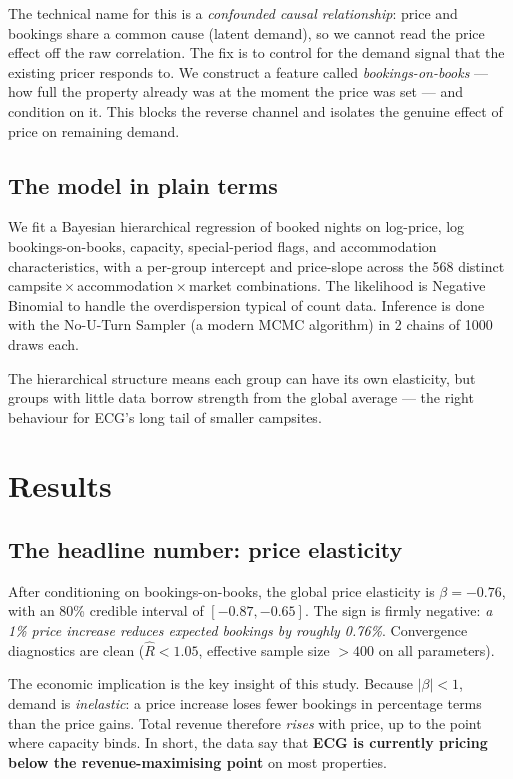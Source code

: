 \documentclass[11pt,a4paper]{article}
\begin{document}
The technical name for this is a \emph{confounded causal relationship}: price and bookings share a common cause (latent demand), so we cannot read the price effect off the raw correlation. The fix is to control for the demand signal that the existing pricer responds to. We construct a feature called \emph{bookings-on-books} --- how full the property already was at the moment the price was set --- and condition on it. This blocks the reverse channel and isolates the genuine effect of price on remaining demand.

\subsection{The model in plain terms}

We fit a Bayesian hierarchical regression of booked nights on log-price, log bookings-on-books, capacity, special-period flags, and accommodation characteristics, with a per-group intercept and price-slope across the 568 distinct campsite\,$\times$\,accommodation\,$\times$\,market combinations. The likelihood is Negative Binomial to handle the overdispersion typical of count data. Inference is done with the No-U-Turn Sampler (a modern MCMC algorithm) in 2 chains of 1000 draws each.

The hierarchical structure means each group can have its own elasticity, but groups with little data borrow strength from the global average --- the right behaviour for ECG's long tail of smaller campsites.

\section{Results}

\subsection{The headline number: price elasticity}

After conditioning on bookings-on-books, the global price elasticity is \textbf{$\beta = -0.76$}, with an 80\% credible interval of $[-0.87, -0.65]$. The sign is firmly negative: \emph{a 1\% price increase reduces expected bookings by roughly 0.76\%}. Convergence diagnostics are clean ($\hat{R}<1.05$, effective sample size $>400$ on all parameters).

The economic implication is the key insight of this study. Because $|\beta| < 1$, demand is \emph{inelastic}: a price increase loses fewer bookings in percentage terms than the price gains. Total revenue therefore \emph{rises} with price, up to the point where capacity binds. In short, the data say that \textbf{ECG is currently pricing below the revenue-maximising point} on most properties.
\end{document}
